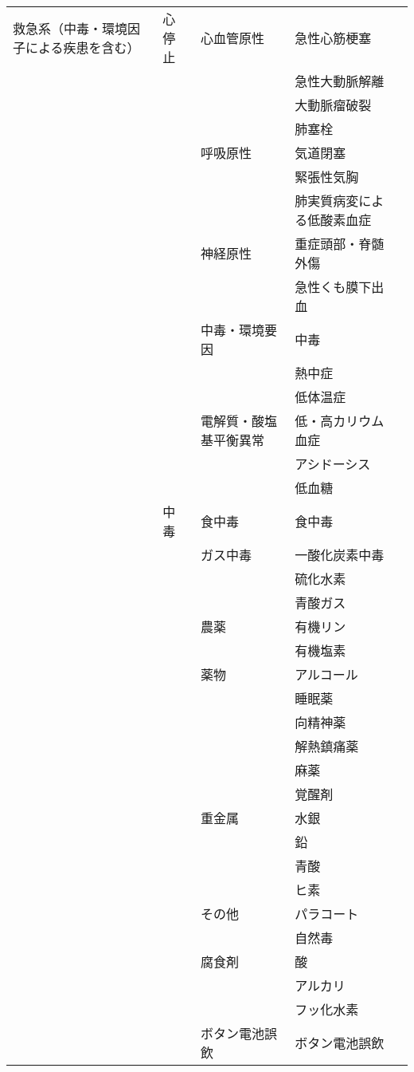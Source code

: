 \begin{xltabular}{\linewidth}{XXXXX}
救急系（中毒・環境因子による疾患を含む） & 心停止 & 心血管原性 & 急性心筋梗塞 &  \\
 &  &  & 急性大動脈解離 &  \\
 &  &  & 大動脈瘤破裂 &  \\
 &  &  & 肺塞栓 &  \\
 &  & 呼吸原性 & 気道閉塞 &  \\
 &  &  & 緊張性気胸 &  \\
 &  &  & 肺実質病変による低酸素血症 &  \\
 &  & 神経原性 & 重症頭部・脊髄外傷 &  \\
 &  &  & 急性くも膜下出血 &  \\
 &  & 中毒・環境要因 & 中毒 &  \\
 &  &  & 熱中症 &  \\
 &  &  & 低体温症 &  \\
 &  & 電解質・酸塩基平衡異常 & 低・高カリウム血症 &  \\
 &  &  & アシドーシス &  \\
 &  &  & 低血糖 &  \\
 & 中毒 & 食中毒 & 食中毒 &  \\
 &  & ガス中毒 & 一酸化炭素中毒 &  \\
 &  &  & 硫化水素 &  \\
 &  &  & 青酸ガス &  \\
 &  & 農薬 & 有機リン &  \\
 &  &  & 有機塩素 &  \\
 &  & 薬物 & アルコール &  \\
 &  &  & 睡眠薬 &  \\
 &  &  & 向精神薬 &  \\
 &  &  & 解熱鎮痛薬 &  \\
 &  &  & 麻薬 &  \\
 &  &  & 覚醒剤 &  \\
 &  & 重金属 & 水銀 &  \\
 &  &  & 鉛 &  \\
 &  &  & 青酸 &  \\
 &  &  & ヒ素 &  \\
 &  & その他 & パラコート &  \\
 &  &  & 自然毒 &  \\
 &  & 腐食剤 & 酸 &  \\
 &  &  & アルカリ &  \\
 &  &  & フッ化水素 &  \\
 &  & ボタン電池誤飲 & ボタン電池誤飲 &  \\
\bottomrule
\end{xltabular}



